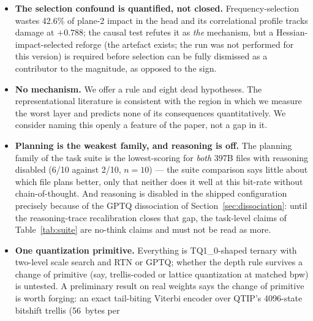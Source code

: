\documentclass[10pt]{article} %
\begin{document}
\begin{itemize}
  the per-sequence budget, and each of the two BoolQ pieces reached its header
  task count (2,000 and 1,270; 3,270 in total) with no ``does not fit'' line,
  so no passage was truncated or skipped; the longest BoolQ passage in the
  converted file is 823 words. Reasoning is off in every measurement. The
  smaller MTP-less sibling of the 35B rival (15.40~GiB, one tensor fewer) was
  not run, so the rival rule was satisfied on tensor set rather than on size
  alone. The internal
  task suite remains private, as in the previous version.
\item \textbf{The selection confound is quantified, not closed.} Frequency-selection
  wastes 42.6\% of plane-2 impact in the head and its correlational profile
  tracks damage at $+0.788$; the causal test refutes it as \emph{the} mechanism,
  but a Hessian-impact-selected reforge (the artefact exists; the run was not
  performed for this version) is required before selection can be fully
  dismissed as a contributor to the magnitude, as opposed to the sign.
\item \textbf{No mechanism.} We offer a rule and eight dead hypotheses. The
  representational literature \citep{wu2025semantichub} is consistent with the
  region in which we measure the worst layer and predicts none of its
  consequences quantitatively. We consider
  naming this openly a feature of the paper, not a gap in it.
\item \textbf{Planning is the weakest family, and reasoning is off.} The
  planning family of the task suite is the lowest-scoring for \emph{both}
  397B files with reasoning disabled (6/10 against 2/10, $n = 10$) --- the
  suite comparison says little about which file plans better, only that
  neither does it well at this bit-rate without chain-of-thought. And
  reasoning is disabled in the shipped configuration
  precisely because of the GPTQ dissociation of
  Section~\ref{sec:dissociation}: until the reasoning-trace recalibration
  closes that gap, the task-level claims of Table~\ref{tab:suite} are
  no-think claims and must not be read as more.
\item \textbf{One quantization primitive.} Everything is TQ1\_0-shaped ternary with
  two-level scale search and RTN or GPTQ; whether the depth rule survives a change
  of primitive (say, trellis-coded \citep{tseng2024qtip} or lattice
  \citep{tseng2024quipsharp} quantization at matched bpw)
  is untested. A preliminary result on real weights says the change of
  primitive is worth forging: an exact tail-biting Viterbi encoder over
  QTIP's 4096-state bitshift trellis \citep{tseng2024qtip} (56~bytes per

\end{itemize}
\end{document}

